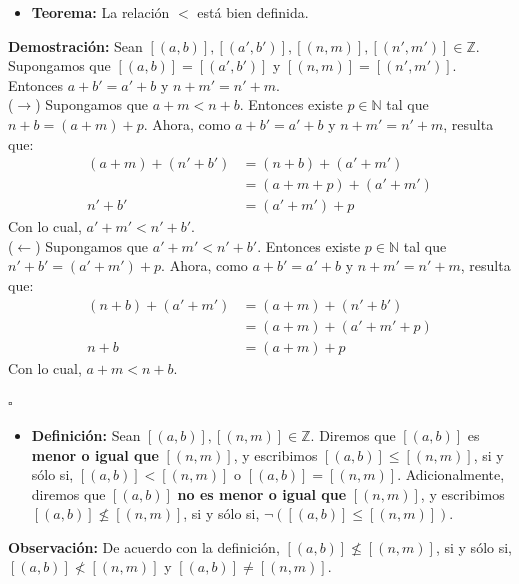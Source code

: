 \documentclass[10 pt]{article}
\begin{document}
\begin{itemize}
    \item \Large{\textbf{Teorema:} La relación $<$ está bien definida.} \\
\end{itemize}

\Large{\textbf{Demostración:} Sean $[(a,b)],[(a',b')],[(n,m)],[(n',m')] \in \mathbb Z$. Supongamos que $[(a,b)]=[(a',b')]$ y $[(n,m)]=[(n',m')]$. Entonces $a+b'=a'+b$ y $n+m'=n'+m$. \\

($\rightarrow$) Supongamos que $a+m<n+b$. Entonces existe $p \in \mathbb N$ tal que $n+b=(a+m)+p$. Ahora, como $a+b'=a'+b$ y $n+m'=n'+m$, resulta que:}
\begin{align*}
    (a+m)+(n'+b')&=(n+b)+(a'+m') \\
    &=(a+m+p)+(a'+m') \\
    n'+b'&=(a'+m')+p
\end{align*}
\Large{Con lo cual, $a'+m'<n'+b'$.} \\

\Large{($\leftarrow$) Supongamos que $a'+m'<n'+b'$. Entonces existe $p \in \mathbb N$ tal que $n'+b'=(a'+m')+p$. Ahora, como $a+b'=a'+b$ y $n+m'=n'+m$, resulta que:}
\begin{align*}
    (n+b)+(a'+m')&=(a+m)+(n'+b') \\
    &=(a+m)+(a'+m'+p) \\
    n+b&=(a+m)+p
\end{align*}
\Large{Con lo cual, $a+m<n+b$.} \\

\begin{flushright}
    $\square$
\end{flushright}

\begin{itemize}
    \item \Large{\textbf{Definición:} Sean $[(a,b)],[(n,m)] \in \mathbb Z$. Diremos que $[(a,b)]$ es \textbf{menor o igual que} $[(n,m)]$, y escribimos \underline{$[(a,b)] \leq [(n,m)]$}, si y sólo si, $[(a,b)]<[(n,m)]$ o $[(a,b)]=[(n,m)]$. Adicionalmente, diremos que $[(a,b)]$ \textbf{no es menor o igual que} $[(n,m)]$, y escribimos \underline{$[(a,b)] \nleq [(n,m)]$}, si y sólo si, $\neg([(a,b)] \leq [(n,m)])$.} \\
\end{itemize}

\Large{\textbf{Observación:} De acuerdo con la definición, $[(a,b)] \nleq [(n,m)]$, si y sólo si, $[(a,b)] \nless [(n,m)]$ y $[(a,b)] \neq [(n,m)]$.} \\
\end{document}
